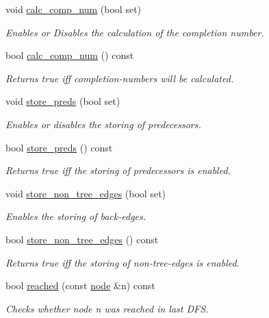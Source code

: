 \begin{DoxyCompactItemize}
void \mbox{\hyperlink{classdfs_a70862ea715c52eb95fb704afd3a6e676}{calc\+\_\+comp\+\_\+num}} (bool set)
\begin{DoxyCompactList}\small\item\em Enables or Disables the calculation of the completion number. \end{DoxyCompactList}\item 
bool \mbox{\hyperlink{classdfs_aba80ac24a78448f10b32473633cd2a5d}{calc\+\_\+comp\+\_\+num}} () const
\begin{DoxyCompactList}\small\item\em Returns true iff completion-\/numbers will be calculated. \end{DoxyCompactList}\item 
void \mbox{\hyperlink{classdfs_a7043f46eb3887cbcbb1391fc783407a4}{store\+\_\+preds}} (bool set)
\begin{DoxyCompactList}\small\item\em Enables or disables the storing of predecessors. \end{DoxyCompactList}\item 
bool \mbox{\hyperlink{classdfs_ad0233128f2958d630102096aa6f3b9ef}{store\+\_\+preds}} () const
\begin{DoxyCompactList}\small\item\em Returns true iff the storing of predecessors is enabled. \end{DoxyCompactList}\item 
void \mbox{\hyperlink{classdfs_a6f54f1c4339eacc8961e795439d4593d}{store\+\_\+non\+\_\+tree\+\_\+edges}} (bool set)
\begin{DoxyCompactList}\small\item\em Enables the storing of back-\/edges. \end{DoxyCompactList}\item 
bool \mbox{\hyperlink{classdfs_a6ac1f01ff594fbbc6e8d6b5bd03fc9ab}{store\+\_\+non\+\_\+tree\+\_\+edges}} () const
\begin{DoxyCompactList}\small\item\em Returns true iff the storing of non-\/tree-\/edges is enabled. \end{DoxyCompactList}\item 
bool \mbox{\hyperlink{classdfs_a2948061eb1ea02f57614f9044c8e63cf}{reached}} (const \mbox{\hyperlink{classnode}{node}} \&n) const
\begin{DoxyCompactList}\small\item\em Checks whether node {\itshape n} was reached in last D\+FS. \end{DoxyCompactList}\item 

\end{DoxyCompactItemize}
